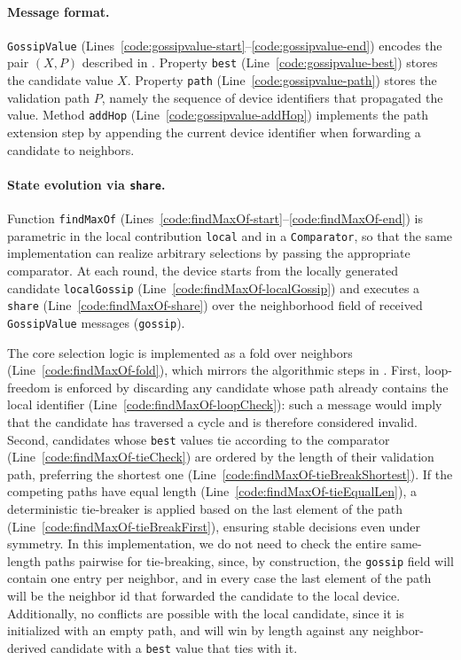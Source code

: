 \documentclass[runningheads]{llncs}
\begin{document}
\paragraph{Message format.}
\lstinline|GossipValue| (Lines~\ref{code:gossipvalue-start}--\ref{code:gossipvalue-end})
encodes the pair $(X,P)$ described in .
%
Property \lstinline|best| (Line~\ref{code:gossipvalue-best}) stores the candidate value $X$.
%
Property \lstinline|path| (Line~\ref{code:gossipvalue-path}) stores the validation path $P$,
namely the sequence of device identifiers that propagated the value.
%
Method \lstinline|addHop| (Line~\ref{code:gossipvalue-addHop}) implements the path extension step by
appending the current device identifier when forwarding a candidate to neighbors.

\paragraph{State evolution via \lstinline|share|.}
Function \lstinline|findMaxOf| (Lines~\ref{code:findMaxOf-start}--\ref{code:findMaxOf-end})
is parametric in the local contribution \lstinline|local| and in a \lstinline|Comparator|,
so that the same implementation can realize arbitrary selections by passing the appropriate comparator.
At each round, the device starts from the locally generated candidate \lstinline|localGossip|
(Line~\ref{code:findMaxOf-localGossip}) and executes a \lstinline|share|
(Line~\ref{code:findMaxOf-share}) over the neighborhood field of received \lstinline|GossipValue| messages
(\lstinline|gossip|).

The core selection logic is implemented as a fold over neighbors (Line~\ref{code:findMaxOf-fold}),
which mirrors the algorithmic steps in .
%
First, loop-freedom is enforced by discarding any candidate whose path already contains the local identifier
(Line~\ref{code:findMaxOf-loopCheck}): such a message would imply that the candidate has traversed a cycle and is therefore considered invalid.
%
Second, candidates whose \lstinline|best| values tie according to the comparator
(Line~\ref{code:findMaxOf-tieCheck}) are ordered by the length of their validation path,
preferring the shortest one (Line~\ref{code:findMaxOf-tieBreakShortest}).
%
If the competing paths have equal length (Line~\ref{code:findMaxOf-tieEqualLen}),
a deterministic tie-breaker is applied based on the last element of the path
(Line~\ref{code:findMaxOf-tieBreakFirst}), ensuring stable decisions even under symmetry.
%
In this implementation, we do not need to check the entire same-length paths pairwise for tie-breaking,
since, by construction, the \lstinline{gossip} field will contain one entry per neighbor,
and in every case the last element of the path will be the neighbor id that forwarded the candidate to the local device.
%
Additionally, no conflicts are possible with the local candidate,
since it is initialized with an empty path,
and will win by length against any neighbor-derived candidate with a \lstinline|best| value that ties with it.
\end{document}
